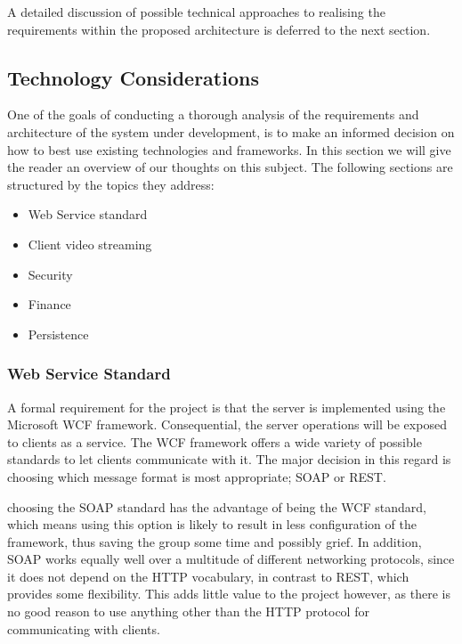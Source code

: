 A detailed discussion of possible technical approaches to realising the requirements within the proposed architecture is deferred to the next section.
\subsection{Technology Considerations}
One of the goals of conducting a thorough analysis of the requirements and architecture of the system under development, is to make an informed decision on how to best use existing technologies and frameworks. In this section we will give the reader an overview of our thoughts on this subject. The following sections are structured by the topics they address:
\begin{itemize}
\item Web Service standard
\item Client video streaming
\item Security
\item Finance
\item Persistence
\end{itemize}

\subsubsection{Web Service Standard}
A formal requirement for the project is that the server is implemented using the Microsoft WCF framework. Consequential, the server operations will be exposed to clients as a service. The WCF framework offers a wide variety of possible standards to let clients communicate with it. The major decision in this regard is choosing which message format is most appropriate; SOAP or REST.

choosing the SOAP standard has the advantage of being the WCF standard, which means using this option is likely to result in less configuration of the framework, thus saving the group some time and possibly grief. In addition, SOAP works equally well over a multitude of different networking protocols, since it does not depend on the HTTP vocabulary, in contrast to REST, which provides some flexibility. This adds little value to the project however, as there is no good reason to use anything other than the HTTP protocol for communicating with clients.

